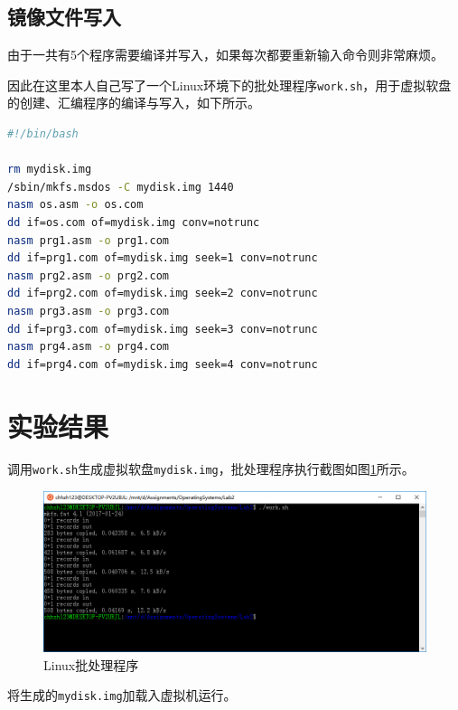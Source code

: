 \documentclass[logo,reportComp]{thesis}
\begin{document}
\subsection{镜像文件写入}
由于一共有5个程序需要编译并写入，如果每次都要重新输入命令则非常麻烦。

因此在这里本人自己写了一个Linux环境下的批处理程序\verb'work.sh'，用于虚拟软盘的创建、汇编程序的编译与写入，如下所示。
\begin{lstlisting}[language=bash]
#!/bin/bash

rm mydisk.img
/sbin/mkfs.msdos -C mydisk.img 1440
nasm os.asm -o os.com
dd if=os.com of=mydisk.img conv=notrunc
nasm prg1.asm -o prg1.com
dd if=prg1.com of=mydisk.img seek=1 conv=notrunc
nasm prg2.asm -o prg2.com
dd if=prg2.com of=mydisk.img seek=2 conv=notrunc
nasm prg3.asm -o prg3.com
dd if=prg3.com of=mydisk.img seek=3 conv=notrunc
nasm prg4.asm -o prg4.com
dd if=prg4.com of=mydisk.img seek=4 conv=notrunc
\end{lstlisting}

\section{实验结果}
调用\verb'work.sh'生成虚拟软盘\verb'mydisk.img'，批处理程序执行截图如图\ref{fig:sh}所示。
\begin{figure}[H]
\centering
\includegraphics[width=\linewidth]{fig/sh.PNG}
\caption{Linux批处理程序}
\label{fig:sh}
\end{figure}

将生成的\verb'mydisk.img'加载入虚拟机运行。
\end{document}
